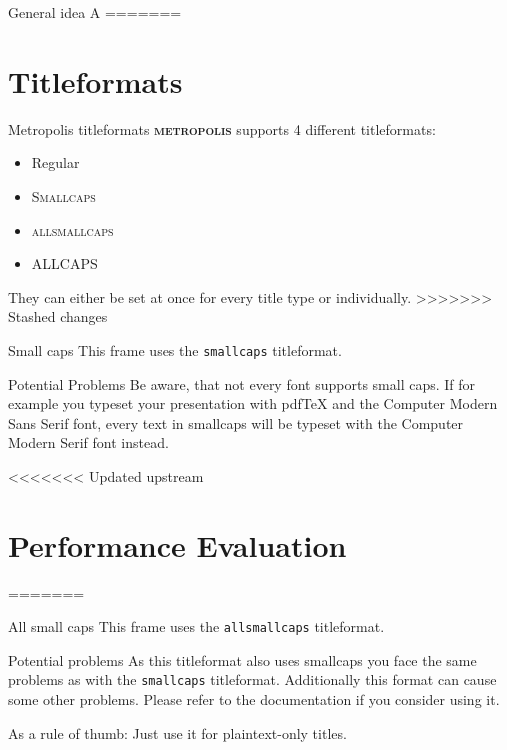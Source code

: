 \documentclass[10pt]{beamer}
\newcommand{\themename}{\textbf{\textsc{metropolis}}\xspace}
\begin{document}
\begin{frame}{General idea}
	A
=======
\section{Titleformats}

\begin{frame}{Metropolis titleformats}
  \themename supports 4 different titleformats:
  \begin{itemize}
    \item Regular
    \item \textsc{Smallcaps}
    \item \textsc{allsmallcaps}
    \item ALLCAPS
  \end{itemize}
  They can either be set at once for every title type or individually.
>>>>>>> Stashed changes
\end{frame}

{
\begin{frame}{Small caps}
  This frame uses the \texttt{smallcaps} titleformat.

  \begin{alertblock}{Potential Problems}
    Be aware, that not every font supports small caps. If for example you typeset your presentation with pdfTeX and the Computer Modern Sans Serif font, every text in smallcaps will be typeset with the Computer Modern Serif font instead.
  \end{alertblock}
\end{frame}
}

<<<<<<< Updated upstream

\section{Performance Evaluation}
=======
{
\begin{frame}{All small caps}
  This frame uses the \texttt{allsmallcaps} titleformat.

  \begin{alertblock}{Potential problems}
    As this titleformat also uses smallcaps you face the same problems as with the \texttt{smallcaps} titleformat. Additionally this format can cause some other problems. Please refer to the documentation if you consider using it.

    As a rule of thumb: Just use it for plaintext-only titles.
  \end{alertblock}
\end{frame}
}


\end{frame}
\end{document}
